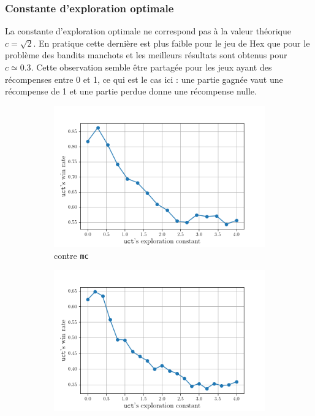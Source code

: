 \documentclass[a4paper]{article}
\theoremstyle{definition}
\begin{document}
\subsubsection{Constante d'exploration optimale}

La constante d'exploration optimale ne correspond pas à la valeur théorique $c=\sqrt{2}$. En pratique cette dernière est plus faible pour le jeu de Hex que pour le problème des bandits manchots et les meilleurs résultats sont obtenus pour $c \simeq 0.3$. Cette observation semble être partagée pour les jeux ayant des récompenses entre 0 et 1, ce qui est le cas ici : une partie gagnée vaut une récompense de 1 et une partie perdue donne une récompense nulle.

\begin{figure}[!h]
	\centering
	\begin{subfigure}{0.49\textwidth}
		\centering
		\includegraphics[width=\textwidth]{test1.png}
		\caption{contre \texttt{mc}}
		\label{fig:1_}
	\end{subfigure}
	\hfill
	\begin{subfigure}{0.49\textwidth}
		\centering
		\includegraphics[width=\textwidth]{test2.png}

\end{subfigure}
\end{figure}
\end{document}
